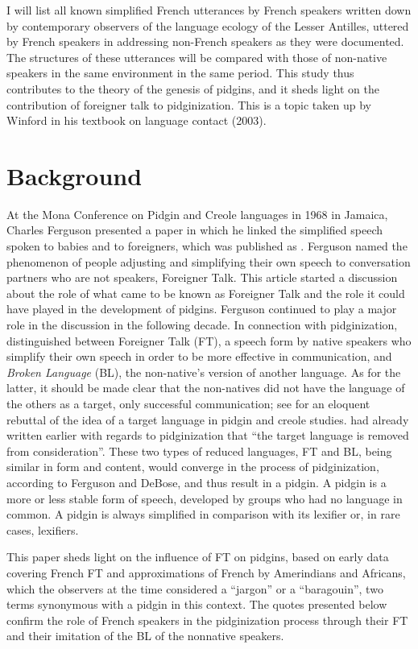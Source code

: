 \documentclass[output=paper,colorlinks,citecolor=brown]{langscibook}
\begin{document}
I will list all known simplified French utterances by French speakers written down by contemporary observers of the language ecology of the Lesser Antilles, uttered by French speakers in addressing non-French speakers as they were documented. The structures of these utterances will be compared with those of non-native speakers in the same environment in the same period. This study thus contributes to the theory of the genesis of pidgins, and it sheds light on the contribution of foreigner talk to pidginization. This is a topic taken up by Winford in his textbook on language contact (2003).

\section{Background} \label{sec:bakker:2}
At the Mona Conference on Pidgin and Creole languages in 1968 in Jamaica, Charles Ferguson presented a paper in which he linked the simplified speech spoken to babies and to foreigners, which was published as \citet{Ferguson1971}. Ferguson named the phenomenon of people adjusting and simplifying their own speech to conversation partners who are not speakers, Foreigner Talk. This article started a discussion about the role of what came to be known as Foreigner Talk and the role it could have played in the development of pidgins. Ferguson continued to play a major role in the discussion in the following decade. In connection with pidginization, \citet{FergusonDeBose1977} distinguished between Foreigner Talk (FT), a speech form by native speakers who simplify their own speech in order to be more effective in communication, and \textit{Broken Language} (BL), the non-native’s version of another language. As for the latter, it should be made clear that the non-natives did not have the language of the others as a target, only successful communication; see \citet{Baker1990} for an eloquent rebuttal of the idea of a target language in pidgin and creole studies.  \citet[105]{Whinnom1971} had already written earlier with regards to pidginization that “the target language is removed from consideration”. These two types of reduced languages, FT and BL, being similar in form and content, would converge in the process of pidginization, according to Ferguson and DeBose, and thus result in a pidgin. A pidgin is a more or less stable form of speech, developed by groups who had no language in common. A pidgin is always simplified in comparison with its lexifier or, in rare cases, lexifiers.

This paper sheds light on the influence of FT on pidgins, based on early data covering French FT and approximations of French by Amerindians and Africans, which the observers at the time considered a “jargon” or a “baragouin”, two terms synonymous with a pidgin in this context. The quotes presented below confirm the role of French speakers in the pidginization process through their FT and their imitation of the BL of the nonnative speakers.
\end{document}
